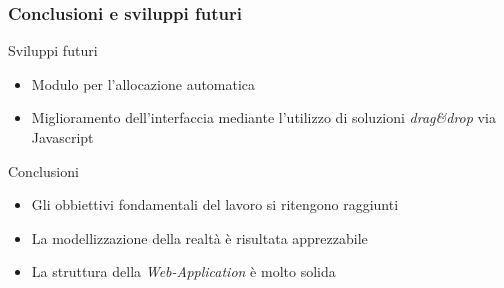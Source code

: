 \begin{frame}
\frametitle{Conclusioni e sviluppi futuri}
\begin{block}{Sviluppi futuri}
\begin{itemize}
\item Modulo per l'allocazione automatica
\item Miglioramento dell'interfaccia mediante
l'utilizzo di soluzioni \emph{drag\&drop} via Javascript\cpr
\end{itemize}
\end{block}
\begin{block}{Conclusioni}
\begin{itemize}
\item Gli obbiettivi fondamentali
del lavoro si ritengono raggiunti
\item La modellizzazione della realtà è risultata apprezzabile
\item La struttura della \emph{Web-Application} è molto solida
\end{itemize}
\end{block}
\end{frame}


